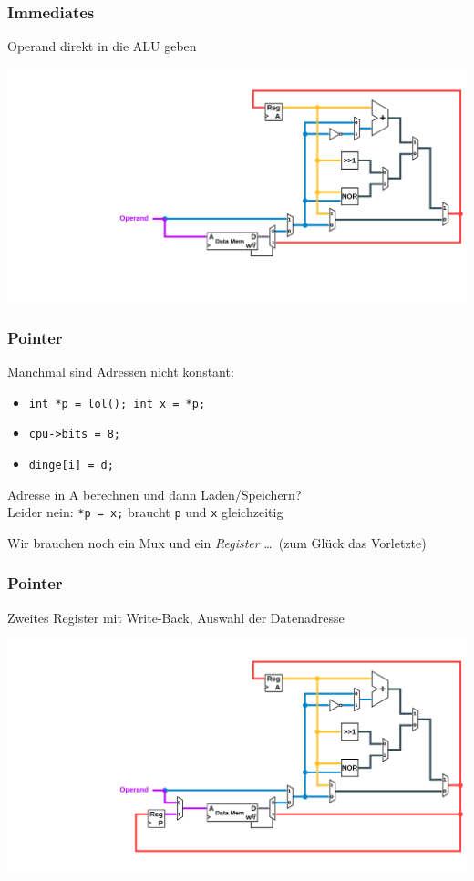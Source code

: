 \documentclass[t,aspectratio=169,usenames,dvipsnames]{beamer}
\begin{document}
\begin{frame}
  \frametitle{Immediates}

  \strut{}Operand direkt in die ALU geben

  \begin{center}
    \includegraphics[width=.85\textwidth]{sch-immediate.pdf}
  \end{center}
\end{frame}

\begin{frame}
  \frametitle{Pointer}

  Manchmal sind Adressen nicht konstant:
  \begin{itemize}
  \item \texttt{int *p = lol(); int x = *p;}
  \item \texttt{cpu->bits = 8;}
  \item \texttt{dinge[i] = d;}
  \end{itemize}

  \bigskip

  Adresse in A berechnen und dann Laden/Speichern?\\
  Leider nein: \texttt{*p = x;} braucht \texttt{p} und \texttt{x} gleichzeitig

  \bigskip
  \pause

  Wir brauchen noch ein Mux und ein \emph{Register} \ldots\ (zum Glück das Vorletzte)

\end{frame}

\begin{frame}
  \frametitle{Pointer}

  \strut{}Zweites Register mit Write-Back, Auswahl der Datenadresse

  \begin{center}
    \includegraphics[width=.85\textwidth]{sch-pointer.pdf}
  \end{center}
\end{frame}
\end{document}
